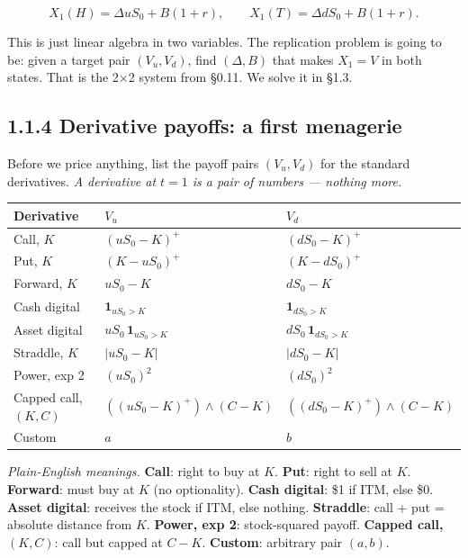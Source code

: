 \documentclass[
  10pt,
  twoside]{book}
\newcounter{none} %
\begin{document}
\[X_1(H) = \Delta uS_0 + B(1+r), \qquad X_1(T) = \Delta dS_0 + B(1+r).\]

This is just linear algebra in two variables. The replication problem is
going to be: given a target pair \((V_u,V_d)\), find \((\Delta,B)\) that
makes \(X_1=V\) in both states. That is the 2×2 system from §0.11. We
solve it in §1.3.

\subsection{1.1.4 Derivative payoffs: a first
menagerie}\label{derivative-payoffs-a-first-menagerie}

Before we price anything, list the payoff pairs \((V_u,V_d)\) for the
standard derivatives. \emph{A derivative at \(t=1\) is a pair of numbers
--- nothing more.}

{\def\LTcaptype{none} %
\begin{table}[H]
\centering
\begin{tabular}{|l|l|l|}
\toprule
Derivative & \(V_u\) & \(V_d\) \\
\midrule



Call, \(K\) & \((uS_0-K)^+\) & \((dS_0-K)^+\) \\
Put, \(K\) & \((K-uS_0)^+\) & \((K-dS_0)^+\) \\
Forward, \(K\) & \(uS_0-K\) & \(dS_0-K\) \\
Cash digital & \(\mathbf 1_{uS_0>K}\) & \(\mathbf 1_{dS_0>K}\) \\
Asset digital & \(uS_0\,\mathbf 1_{uS_0>K}\) &
\(dS_0\,\mathbf 1_{dS_0>K}\) \\
Straddle, \(K\) & \(\lvert uS_0-K\rvert\) & \(\lvert dS_0-K\rvert\) \\
Power, exp 2 & \((uS_0)^2\) & \((dS_0)^2\) \\
Capped call, \((K,C)\) & \(((uS_0-K)^+)\wedge(C-K)\) &
\(((dS_0-K)^+)\wedge(C-K)\) \\
Custom & \(a\) & \(b\) \\
\bottomrule
\end{tabular}
\end{table}
}

\emph{Plain-English meanings.} \textbf{Call}: right to buy at \(K\).
\textbf{Put}: right to sell at \(K\). \textbf{Forward}: must buy at
\(K\) (no optionality). \textbf{Cash digital}: \$1 if ITM, else \$0.
\textbf{Asset digital}: receives the stock if ITM, else nothing.
\textbf{Straddle}: call + put = absolute distance from \(K\).
\textbf{Power, exp 2}: stock-squared payoff. \textbf{Capped call,
\((K,C)\)}: call but capped at \(C-K\). \textbf{Custom}: arbitrary pair
\((a,b)\).
\end{document}
